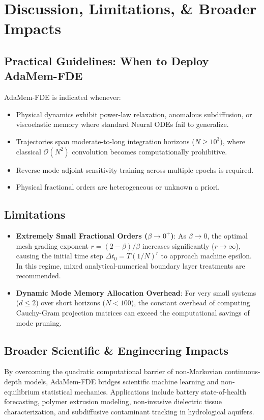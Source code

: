 \documentclass[11pt,a4paper]{article}
\theoremstyle{plain}
\theoremstyle{definition}
\newcommand{\dt}{\Delta t}
\begin{document}
\section{Discussion, Limitations, \& Broader Impacts}
\label{sec:discussion}

\subsection{Practical Guidelines: When to Deploy AdaMem-FDE}
AdaMem-FDE is indicated whenever:
\begin{itemize}
    \item Physical dynamics exhibit power-law relaxation, anomalous subdiffusion, or viscoelastic memory where standard Neural ODEs fail to generalize.
    \item Trajectories span moderate-to-long integration horizons ($N \ge 10^3$), where classical $\mathcal{O}(N^2)$ convolution becomes computationally prohibitive.
    \item Reverse-mode adjoint sensitivity training across multiple epochs is required.
    \item Physical fractional orders are heterogeneous or unknown a priori.
\end{itemize}

\subsection{Limitations}
\begin{itemize}
    \item \textbf{Extremely Small Fractional Orders ($\beta \to 0^+$)}: As $\beta \to 0$, the optimal mesh grading exponent $r = (2-\beta)/\beta$ increases significantly ($r \to \infty$), causing the initial time step $\dt_0 = T(1/N)^r$ to approach machine epsilon. In this regime, mixed analytical-numerical boundary layer treatments are recommended.
    \item \textbf{Dynamic Mode Memory Allocation Overhead}: For very small systems ($d \le 2$) over short horizons ($N < 100$), the constant overhead of computing Cauchy-Gram projection matrices can exceed the computational savings of mode pruning.
\end{itemize}

\subsection{Broader Scientific \& Engineering Impacts}
By overcoming the quadratic computational barrier of non-Markovian continuous-depth models, AdaMem-FDE bridges scientific machine learning and non-equilibrium statistical mechanics. Applications include battery state-of-health forecasting, polymer extrusion modeling, non-invasive dielectric tissue characterization, and subdiffusive contaminant tracking in hydrological aquifers.
\end{document}
